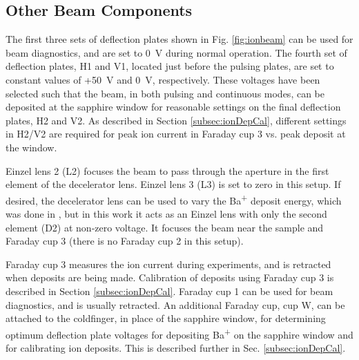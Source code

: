 
\subsection{Other Beam Components}

The first three sets of deflection plates shown in Fig. \ref{fig:ionbeam} can be used for beam diagnostics, and are set to 0~V during normal operation.  The fourth set of deflection plates, H1 and V1, located just before the pulsing plates, are set to constant values of +50~V and 0~V, respectively.  These voltages have been selected such that the beam, in both pulsing and continuous modes, can be deposited at the sapphire window for reasonable settings on the final deflection plates, H2 and V2.  As described in Section \ref{subsec:ionDepCal}, different settings in H2/V2 are required for peak ion current in Faraday cup 3 vs. peak deposit at the window.

Einzel lens 2 (L2) focuses the beam to pass through the aperture in the first element of the decelerator lens.  Einzel lens 3 (L3) is set to zero in this setup.  If desired, the decelerator lens can be used to vary the Ba\textsuperscript{+} deposit energy, which was done in \cite{Shon}, but in this work it acts as an Einzel lens with only the second element (D2) at non-zero voltage.  It focuses the beam near the sample and Faraday cup 3 (there is no Faraday cup 2 in this setup).

Faraday cup 3 measures the ion current during experiments, and is retracted when deposits are being made.  Calibration of deposits using Faraday cup 3 is described in Section \ref{subsec:ionDepCal}.  Faraday cup 1 can be used for beam diagnostics, and is usually retracted.  An additional Faraday cup, cup W, can be attached to the coldfinger, in place of the sapphire window, for determining optimum deflection plate voltages for depositing Ba\textsuperscript{+} on the sapphire window and for calibrating ion deposits.  This is described further in Sec. \ref{subsec:ionDepCal}.

